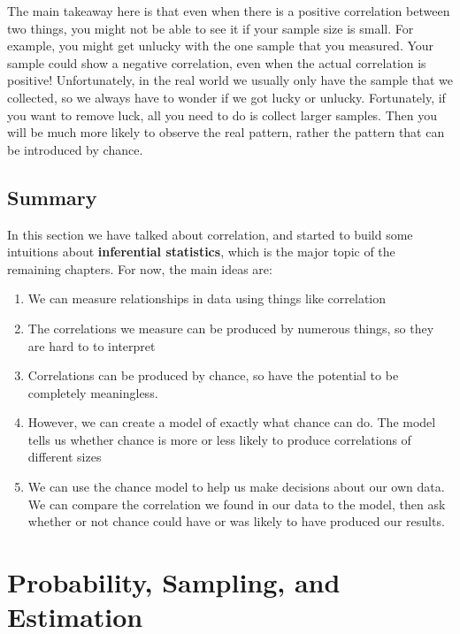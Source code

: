 \documentclass[]{book}
\providecommand{\tightlist}{%
  \setlength{\itemsep}{0pt}\setlength{\parskip}{0pt}}
\begin{document}
The main takeaway here is that even when there is a positive correlation between two things, you might not be able to see it if your sample size is small. For example, you might get unlucky with the one sample that you measured. Your sample could show a negative correlation, even when the actual correlation is positive! Unfortunately, in the real world we usually only have the sample that we collected, so we always have to wonder if we got lucky or unlucky. Fortunately, if you want to remove luck, all you need to do is collect larger samples. Then you will be much more likely to observe the real pattern, rather the pattern that can be introduced by chance.

\hypertarget{summary}{%
\section{Summary}\label{summary}}

In this section we have talked about correlation, and started to build some intuitions about \textbf{inferential statistics}, which is the major topic of the remaining chapters. For now, the main ideas are:

\begin{enumerate}
\def\labelenumi{\arabic{enumi}.}
\tightlist
\item
  We can measure relationships in data using things like correlation
\item
  The correlations we measure can be produced by numerous things, so they are hard to to interpret
\item
  Correlations can be produced by chance, so have the potential to be completely meaningless.
\item
  However, we can create a model of exactly what chance can do. The model tells us whether chance is more or less likely to produce correlations of different sizes
\item
  We can use the chance model to help us make decisions about our own data. We can compare the correlation we found in our data to the model, then ask whether or not chance could have or was likely to have produced our results.
\end{enumerate}

\hypertarget{probability-sampling-and-estimation}{%
\chapter{Probability, Sampling, and Estimation}\label{probability-sampling-and-estimation}}
\end{document}
